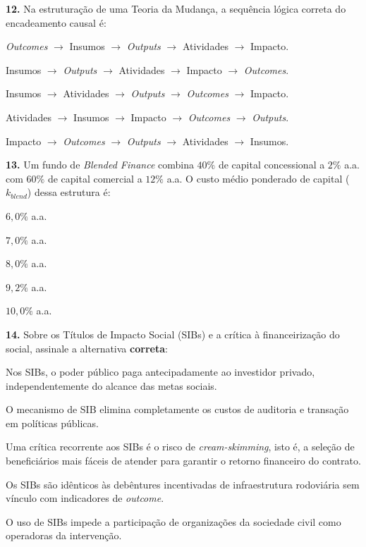\textbf{12.} Na estruturação de uma Teoria da Mudança, a sequência lógica correta do encadeamento causal é:
\begin{alternativas}
  \item \textit{Outcomes} $\to$ Insumos $\to$ \textit{Outputs} $\to$ Atividades $\to$ Impacto.
  \item Insumos $\to$ \textit{Outputs} $\to$ Atividades $\to$ Impacto $\to$ \textit{Outcomes}.
  \item Insumos $\to$ Atividades $\to$ \textit{Outputs} $\to$ \textit{Outcomes} $\to$ Impacto.
  \item Atividades $\to$ Insumos $\to$ Impacto $\to$ \textit{Outcomes} $\to$ \textit{Outputs}.
  \item Impacto $\to$ \textit{Outcomes} $\to$ \textit{Outputs} $\to$ Atividades $\to$ Insumos.
\end{alternativas}

\textbf{13.} Um fundo de \textit{Blended Finance} combina $40\%$ de capital concessional a $2\%$ a.a. com $60\%$ de capital comercial a $12\%$ a.a. O custo médio ponderado de capital ($k_{blend}$) dessa estrutura é:
\begin{alternativas}
  \item $6{,}0\%$ a.a.
  \item $7{,}0\%$ a.a.
  \item $8{,}0\%$ a.a.
  \item $9{,}2\%$ a.a.
  \item $10{,}0\%$ a.a.
\end{alternativas}

\textbf{14.} Sobre os Títulos de Impacto Social (SIBs) e a crítica à financeirização do social, assinale a alternativa \textbf{correta}:
\begin{alternativas}
  \item Nos SIBs, o poder público paga antecipadamente ao investidor privado, independentemente do alcance das metas sociais.
  \item O mecanismo de SIB elimina completamente os custos de auditoria e transação em políticas públicas.
  \item Uma crítica recorrente aos SIBs é o risco de \textit{cream-skimming}, isto é, a seleção de beneficiários mais fáceis de atender para garantir o retorno financeiro do contrato.
  \item Os SIBs são idênticos às debêntures incentivadas de infraestrutura rodoviária sem vínculo com indicadores de \textit{outcome}.
  \item O uso de SIBs impede a participação de organizações da sociedade civil como operadoras da intervenção.
\end{alternativas}

